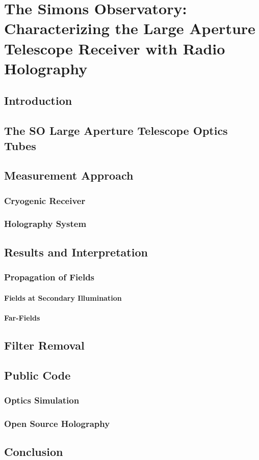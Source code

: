 \chapter{The Simons Observatory: Characterizing the Large Aperture Telescope Receiver with Radio Holography}
\label{ch:ot_holo}
\section{Introduction}
\section{The SO Large Aperture Telescope Optics Tubes}
\section{Measurement Approach}
\subsection{Cryogenic Receiver}
\subsection{Holography System}
\section{Results and Interpretation}
\subsection{Propagation of Fields}
\subsubsection{Fields at Secondary Illumination}
\subsubsection{Far-Fields}
\section{Filter Removal}
\section{Public Code}
\subsection{Optics Simulation}
\subsection{Open Source Holography}
\section{Conclusion}